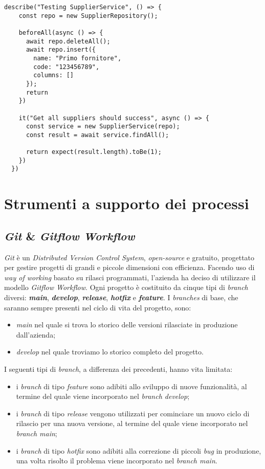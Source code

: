 \newpage
\begin{lstlisting}[caption=Esempio di \emph{test}, label={code:test}, captionpos=b]
  describe("Testing SupplierService", () => {
    const repo = new SupplierRepository();

    beforeAll(async () => {
      await repo.deleteAll();
      await repo.insert({
        name: "Primo fornitore",
        code: "123456789",
        columns: []
      });
      return 
    })

    it("Get all suppliers should success", async () => {
      const service = new SupplierService(repo);
      const result = await service.findAll();

      return expect(result.length).toBe(1);
    })
  })
\end{lstlisting}

\section{Strumenti a supporto dei processi}

\subsection{\emph{Git} \& \emph{Gitflow Workflow}}
\emph{Git} è un \emph{Distributed Version Control System}, \emph{open-source} e gratuito, progettato per gestire progetti di grandi e piccole dimensioni con efficienza.
Facendo uso di \emph{way of working} basato su rilasci programmati, l'azienda ha deciso di utilizzare il modello \emph{Gitflow Workflow}. 
Ogni progetto è costituito da cinque tipi di \emph{branch} diversi: \textbf{\emph{main}}, \textbf{\emph{develop}}, \textbf{\emph{release}}, \textbf{\emph{hotfix}} e \textbf{\emph{feature}}. 
I \emph{branches} di base, che saranno sempre presenti nel ciclo di vita del progetto, sono:
\begin{itemize}
  \item \emph{main} nel quale si trova lo storico delle versioni rilasciate in produzione dall'azienda;
  \item \emph{develop} nel quale troviamo lo storico completo del progetto. 
\end{itemize}  

I seguenti tipi di \emph{branch}, a differenza dei precedenti, hanno vita limitata:
\begin{itemize}
  \item i \emph{branch} di tipo \emph{feature} sono adibiti allo sviluppo di nuove funzionalità, al termine del quale viene incorporato nel \emph{branch develop}; 
  \item i \emph{branch} di tipo \emph{release} vengono utilizzati per cominciare un nuovo ciclo di rilascio per una nuova versione, al termine del quale viene incorporato nel \emph{branch main}; 
  \item i \emph{branch} di tipo \emph{hotfix} sono adibiti alla correzione di piccoli \emph{bug} in produzione, una volta risolto il problema viene incorporato nel \emph{branch main}.
\end{itemize}

